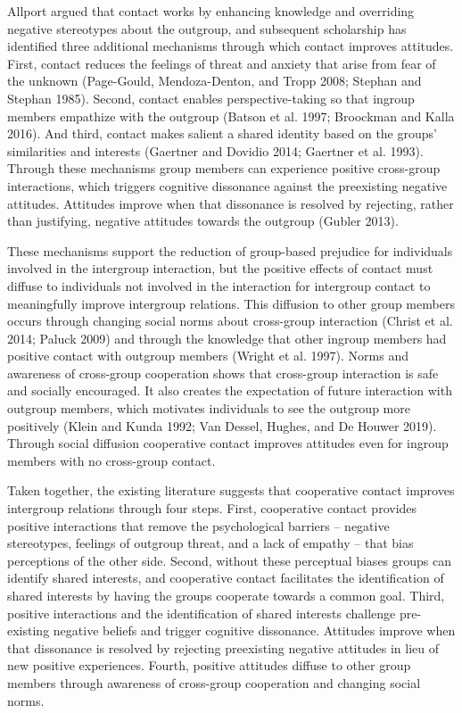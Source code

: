 \documentclass[11pt]{article}
\begin{document}
Allport argued that contact works by enhancing knowledge and overriding
negative stereotypes about the outgroup, and subsequent scholarship has
identified three additional mechanisms through which contact improves
attitudes. First, contact reduces the feelings of threat and anxiety
that arise from fear of the unknown (Page-Gould, Mendoza-Denton, and
Tropp 2008; Stephan and Stephan 1985). Second, contact enables
perspective-taking so that ingroup members empathize with the outgroup
(Batson et al. 1997; Broockman and Kalla 2016). And third, contact makes
salient a shared identity based on the groups' similarities and
interests (Gaertner and Dovidio 2014; Gaertner et al. 1993). Through
these mechanisms group members can experience positive cross-group
interactions, which triggers cognitive dissonance against the
preexisting negative attitudes. Attitudes improve when that dissonance
is resolved by rejecting, rather than justifying, negative attitudes
towards the outgroup (Gubler 2013).

These mechanisms support the reduction of group-based prejudice for
individuals involved in the intergroup interaction, but the positive
effects of contact must diffuse to individuals not involved in the
interaction for intergroup contact to meaningfully improve intergroup
relations. This diffusion to other group members occurs through changing
social norms about cross-group interaction (Christ et al. 2014; Paluck
2009) and through the knowledge that other ingroup members had positive
contact with outgroup members (Wright et al. 1997). Norms and awareness
of cross-group cooperation shows that cross-group interaction is safe
and socially encouraged. It also creates the expectation of future
interaction with outgroup members, which motivates individuals to see
the outgroup more positively (Klein and Kunda 1992; Van Dessel, Hughes,
and De Houwer 2019). Through social diffusion cooperative contact
improves attitudes even for ingroup members with no cross-group contact.

Taken together, the existing literature suggests that cooperative
contact improves intergroup relations through four steps. First,
cooperative contact provides positive interactions that remove the
psychological barriers -- negative stereotypes, feelings of outgroup
threat, and a lack of empathy -- that bias perceptions of the other
side. Second, without these perceptual biases groups can identify shared
interests, and cooperative contact facilitates the identification of
shared interests by having the groups cooperate towards a common goal.
Third, positive interactions and the identification of shared interests
challenge pre-existing negative beliefs and trigger cognitive
dissonance. Attitudes improve when that dissonance is resolved by
rejecting preexisting negative attitudes in lieu of new positive
experiences. Fourth, positive attitudes diffuse to other group members
through awareness of cross-group cooperation and changing social norms.
\end{document}
